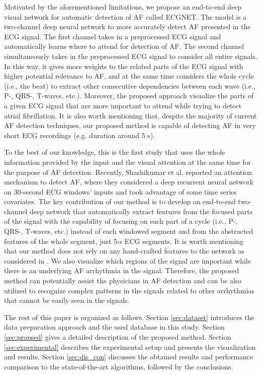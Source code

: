 \documentclass[conference]{IEEEtran}
\begin{document}
Motivated by the aforementioned limitations, we propose an end-to-end deep visual network for automatic detection of AF called ECGNET. 
The model is a two-channel deep neural network to more accurately detect
AF presented in the ECG signal. The first channel takes in a preprocessed ECG signal and automatically learns where to attend for detection of AF.  The  second channel simultaneously takes in the preprocessed ECG signal to consider all entire signals. In this way, it gives more weights to the related parts of the ECG signal with higher potential relevance to AF, and at the same time considers the whole cycle (i.e., the beat) to extract other consecutive dependencies between each wave (i.e., P-,  QRS-, T-waves,  etc.). Moreover, the proposed approach visualize the parts of a given  ECG  signal that are more important to attend while trying to detect atrial fibrillation. It is also worth mentioning that, despite the majority of current AF detection techniques, our proposed method is capable of detecting AF in very short ECG recordings (e.g. duration around 5 s).

To the best of our knowledge, this is the first study that uses the whole information provided by the input and the visual attention at the same time for the purpose of AF detection. Recently, Shashikumar et al. \cite{shashikumar2018detection} reported an attention mechanism to detect AF, where they considered a deep recurrent neural network on 30-second ECG windows' inputs and took advantage of some time series covariates. The key contribution of our method is to develop an end-to-end two-channel deep network that automatically extract features from the focused parts of the signal with the capability of focusing on each part of a cycle (i.e., P-, QRS-, T-waves, etc.) instead of each windowed segment and from the abstracted features of the whole segment, just 5-s ECG segments. It is worth mentioning that our method does not rely on any hand-crafted features to the network as considered in \cite{shashikumar2018detection}. We also visualize which regions of the signal are important while there is an underlying AF arrhythmia in the signal. Therefore, the proposed method can potentially assist the physicians in AF detection and can be also utilized to recognize complex patterns in the signals related to other arrhythmias that cannot be easily seen in the signals. 

The rest of this paper is organized as follows. Section \ref{sec:dataset} introduces the data preparation approach and the used database in this study. Section \ref{sec:propsed} gives a
detailed description of the proposed method. Section
\ref{sec:experimental} describes the experimental setup and presents the visualization and results. Section \ref{sec:dis_con} discusses the obtained results and performance comparison to the state-of-the-art algorithms, followed by the conclusions.
\end{document}
